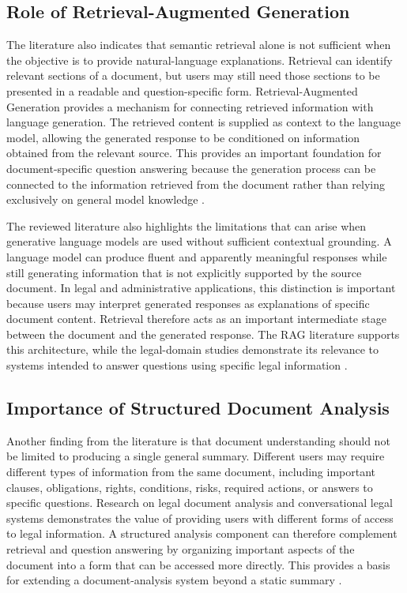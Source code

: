 \documentclass[12pt,a4paper,oneside]{report}
\begin{document}
\subsection{Role of Retrieval-Augmented Generation}

The literature also indicates that semantic retrieval alone is not sufficient
when the objective is to provide natural-language explanations. Retrieval can
identify relevant sections of a document, but users may still need those
sections to be presented in a readable and question-specific form.
Retrieval-Augmented Generation provides a mechanism for connecting retrieved
information with language generation. The retrieved content is supplied as
context to the language model, allowing the generated response to be
conditioned on information obtained from the relevant source. This provides
an important foundation for document-specific question answering because the
generation process can be connected to the information retrieved from the
document rather than relying exclusively on general model knowledge
\cite{lewis2020rag,jurisai2025}.

The reviewed literature also highlights the limitations that can arise when
generative language models are used without sufficient contextual grounding.
A language model can produce fluent and apparently meaningful responses while
still generating information that is not explicitly supported by the source
document. In legal and administrative applications, this distinction is
important because users may interpret generated responses as explanations of
specific document content. Retrieval therefore acts as an important
intermediate stage between the document and the generated response. The RAG
literature supports this architecture, while the legal-domain studies
demonstrate its relevance to systems intended to answer questions using
specific legal information
\cite{basha2024,lewis2020rag,jurisai2025}.

\subsection{Importance of Structured Document Analysis}

Another finding from the literature is that document understanding should not
be limited to producing a single general summary. Different users may require
different types of information from the same document, including important
clauses, obligations, rights, conditions, risks, required actions, or answers
to specific questions. Research on legal document analysis and conversational
legal systems demonstrates the value of providing users with different forms
of access to legal information. A structured analysis component can therefore
complement retrieval and question answering by organizing important aspects of
the document into a form that can be accessed more directly. This provides a
basis for extending a document-analysis system beyond a static summary
\cite{nethriya2024,kandula2023,trivedi2024}.
\end{document}
